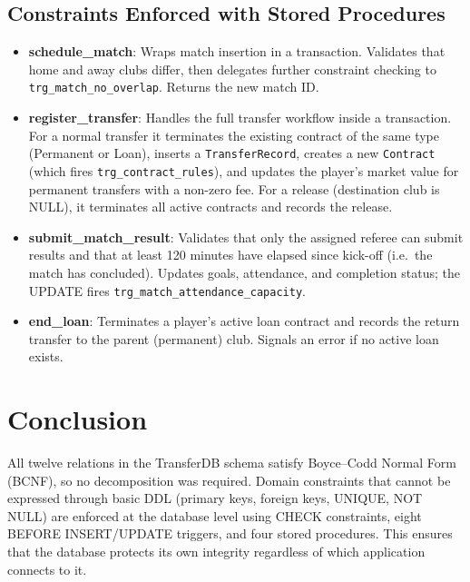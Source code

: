 \documentclass[12pt]{article}
\begin{document}
\subsection{Constraints Enforced with Stored Procedures}
\begin{itemize}[leftmargin=*]
    \item \textbf{schedule\_match}: Wraps match insertion in a transaction. Validates that home and away clubs differ, then delegates further constraint checking to \texttt{trg\_match\_no\_overlap}. Returns the new match ID.
    \item \textbf{register\_transfer}: Handles the full transfer workflow inside a transaction. For a normal transfer it terminates the existing contract of the same type (Permanent or Loan), inserts a \texttt{TransferRecord}, creates a new \texttt{Contract} (which fires \texttt{trg\_contract\_rules}), and updates the player's market value for permanent transfers with a non-zero fee. For a release (destination club is NULL), it terminates all active contracts and records the release.
    \item \textbf{submit\_match\_result}: Validates that only the assigned referee can submit results and that at least 120 minutes have elapsed since kick-off (i.e.\ the match has concluded). Updates goals, attendance, and completion status; the UPDATE fires \texttt{trg\_match\_attendance\_capacity}.
    \item \textbf{end\_loan}: Terminates a player's active loan contract and records the return transfer to the parent (permanent) club. Signals an error if no active loan exists.
\end{itemize}

\section{Conclusion}
All twelve relations in the TransferDB schema satisfy Boyce--Codd Normal Form (BCNF), so no decomposition was required. Domain constraints that cannot be expressed through basic DDL (primary keys, foreign keys, UNIQUE, NOT NULL) are enforced at the database level using CHECK constraints, eight BEFORE INSERT/UPDATE triggers, and four stored procedures. This ensures that the database protects its own integrity regardless of which application connects to it.
\end{document}
